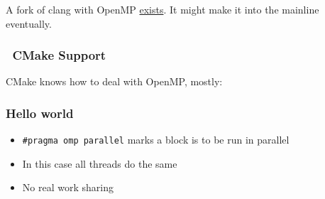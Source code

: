 A fork of clang with OpenMP \href{http://clang-omp.github.io/}{exists}.
It might make it into the mainline eventually.

\subsubsection{~CMake Support}\label{cmake-support}

CMake knows how to deal with OpenMP, mostly:

\begin{Shaded}
\begin{Highlighting}[]

  \NormalTok{)}
   \NormalTok{)}
\NormalTok{()}
\end{Highlighting}
\end{Shaded}

\subsubsection{Hello world}\label{hello-world}

\begin{Shaded}
\begin{Highlighting}[]

   
\NormalTok{\{}
    \NormalTok{\{   }
         \NormalTok{;}
         \NormalTok{;}
         
            \NormalTok{<< } 
    \NormalTok{\}}
\NormalTok{\}}
\end{Highlighting}
\end{Shaded}

\begin{itemize}
\itemsep1pt\parskip0pt
\item
  \texttt{\#pragma omp parallel} marks a block is to be run in parallel
\item
  In this case all threads do the same
\item
  No real work sharing
\end{itemize}

